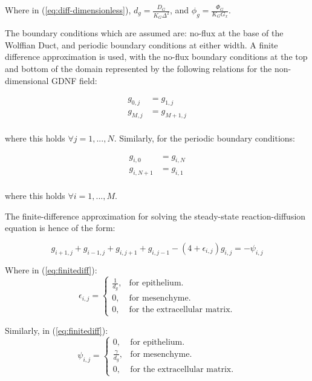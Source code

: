 \documentclass[pdftex,10pt,a4paper]{article}
\begin{document}
Where in (\ref{eq:diff-dimensionless}), $d_g = \frac{D_G}{K_G \Delta^2}$, and $\phi_g = \frac{\Phi_G}{K_G G_x}$.

The boundary conditions which are assumed are: no-flux at the base of the Wolffian Duct, and periodic boundary conditions at either width. A finite difference approximation is used, with the no-flux boundary conditions at the top and bottom of the domain represented by the following relations for the non-dimensional GDNF field:

\begin{align*}
g_{0,j}& = g_{1,j}\\
g_{M,j}& = g_{M+1,j}\\
\end{align*}

where this holds $\forall j = 1,...,N$. Similarly, for the periodic boundary conditions:

\begin{align*}
g_{i,0}& = g_{i,N}\\
g_{i,N+1}& = g_{i,1}\\
\end{align*}

where this holds $\forall i = 1,...,M$.

The finite-difference approximation for solving the steady-state reaction-diffusion equation is hence of the form:

\begin{equation}\label{eq:finitediff}
g_{i+1,j} + g_{i-1,j} + g_{i,j+1} + g_{i,j-1} - (4 + \epsilon_{i,j})g_{i,j} = -\psi_{i,j}
\end{equation}

Where in (\ref{eq:finitediff}):
\begin{equation}
\epsilon_{i,j} =\begin{cases}
\frac{1}{d_g}, & \text{for epithelium}.\\
0, & \text{for mesenchyme}.\\
0, & \text{for the extracellular matrix}.
\end{cases}
\end{equation}

Similarly, in (\ref{eq:finitediff}):
\begin{equation} \label{eq:psi}
\psi_{i,j} =\begin{cases}
0, & \text{for epithelium}.\\
\frac{\gamma}{d_g}, & \text{for mesenchyme}.\\
0, & \text{for the extracellular matrix}.
\end{cases}
\end{equation}
\end{document}
